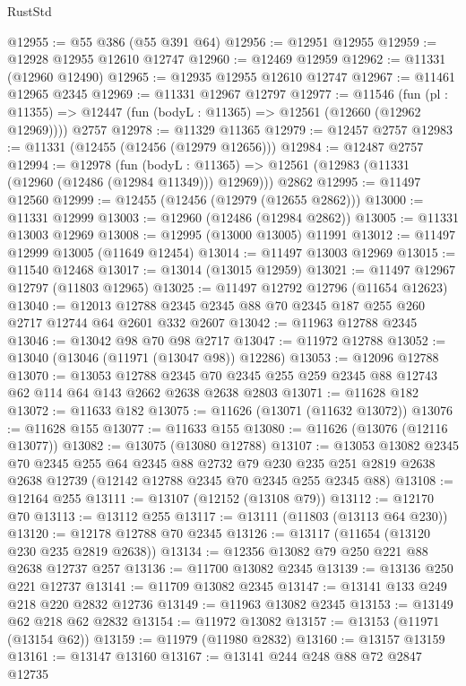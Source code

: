 \begin{lexlean}{RustStd}
\begin{coremodule}
@12955 := @55 @386 (@55 @391 @64)
@12956 := @12951 @12955
@12959 := @12928 @12955 @12610 @12747
@12960 := @12469 @12959
@12962 := @11331 (@12960 @12490)
@12965 := @12935 @12955 @12610 @12747
@12967 := @11461 @12965 @2345
@12969 := @11331 @12967 @12797
@12977 := @11546
    (fun (pl : @11355) => @12447 (fun (bodyL : @11365) => @12561 (@12660 (@12962 @12969))))
    @2757
@12978 := @11329 @11365
@12979 := @12457 @2757
@12983 := @11331 (@12455 (@12456 (@12979 @12656)))
@12984 := @12487 @2757
@12994 := @12978
    (fun (bodyL : @11365) => @12561 (@12983 (@11331 (@12960 (@12486 (@12984 @11349))) @12969)))
    @2862
@12995 := @11497 @12560
@12999 := @12455 (@12456 (@12979 (@12655 @2862)))
@13000 := @11331 @12999
@13003 := @12960 (@12486 (@12984 @2862))
@13005 := @11331 @13003 @12969
@13008 := @12995 (@13000 @13005) @11991
@13012 := @11497 @12999 @13005 (@11649 @12454)
@13014 := @11497 @13003 @12969
@13015 := @11540 @12468
@13017 := @13014 (@13015 @12959)
@13021 := @11497 @12967 @12797 (@11803 @12965)
@13025 := @11497 @12792 @12796 (@11654 @12623)
@13040 := @12013 @12788 @2345 @2345 @88 @70 @2345 @187 @255 @260 @2717 @12744 @64 @2601 @332 @2607
@13042 := @11963 @12788 @2345
@13046 := @13042 @98 @70 @98 @2717
@13047 := @11972 @12788
@13052 := @13040 (@13046 (@11971 (@13047 @98)) @12286)
@13053 := @12096 @12788
@13070 := @13053
    @12788
    @2345
    @70
    @2345
    @255
    @259
    @2345
    @88
    @12743
    @62
    @114
    @64
    @143
    @2662
    @2638
    @2638
    @2803
@13071 := @11628 @182
@13072 := @11633 @182
@13075 := @11626 (@13071 (@11632 @13072))
@13076 := @11628 @155
@13077 := @11633 @155
@13080 := @11626 (@13076 (@12116 @13077))
@13082 := @13075 (@13080 @12788)
@13107 := @13053
    @13082
    @2345
    @70
    @2345
    @255
    @64
    @2345
    @88
    @2732
    @79
    @230
    @235
    @251
    @2819
    @2638
    @2638
    @12739
    (@12142 @12788 @2345 @70 @2345 @255 @2345 @88)
@13108 := @12164 @255
@13111 := @13107 (@12152 (@13108 @79))
@13112 := @12170 @70
@13113 := @13112 @255
@13117 := @13111 (@11803 (@13113 @64 @230))
@13120 := @12178 @12788 @70 @2345
@13126 := @13117 (@11654 (@13120 @230 @235 @2819 @2638))
@13134 := @12356 @13082 @79 @250 @221 @88 @2638 @12737 @257
@13136 := @11700 @13082 @2345
@13139 := @13136 @250 @221 @12737
@13141 := @11709 @13082 @2345
@13147 := @13141 @133 @249 @218 @220 @2832 @12736
@13149 := @11963 @13082 @2345
@13153 := @13149 @62 @218 @62 @2832
@13154 := @11972 @13082
@13157 := @13153 (@11971 (@13154 @62))
@13159 := @11979 (@11980 @2832)
@13160 := @13157 @13159
@13161 := @13147 @13160
@13167 := @13141 @244 @248 @88 @72 @2847 @12735

\end{coremodule}
\end{lexlean}
